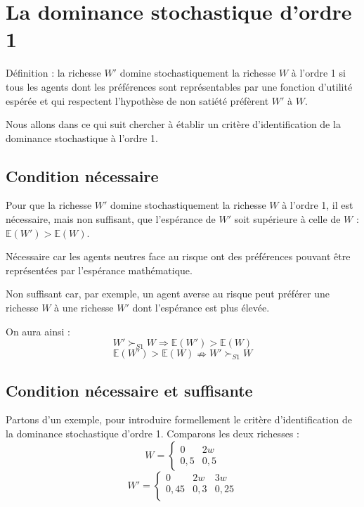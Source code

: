 \documentclass[a4paper, 12pt]{report}
\begin{document}
\section{La dominance stochastique d'ordre 1}


Définition : la richesse \( W' \) domine stochastiquement la richesse \( W \) à l'ordre 1 si tous les agents dont les préférences sont représentables par une fonction d'utilité espérée et qui respectent l'hypothèse de non satiété préfèrent \( W' \) à \( W \).

Nous allons dans ce qui suit chercher à établir un critère d'identification de la dominance stochastique à l'ordre 1.

\subsection{Condition nécessaire}

Pour que la richesse \( W' \) domine stochastiquement la richesse \( W \) à l'ordre 1, il est nécessaire, mais non suffisant, que l'espérance de \( W' \) soit supérieure à celle de \( W \) : \( \mathbb{E}(W') > \mathbb{E}(W) \).

Nécessaire car les agents neutres face au risque ont des préférences pouvant être représentées par l'espérance mathématique.

Non suffisant car, par exemple, un agent averse au risque peut préférer une richesse \( W \) à une richesse \( W' \) dont l'espérance est plus élevée.

On aura ainsi :
\[
W' \succ_{S1} W \Rightarrow \mathbb{E}(W') > \mathbb{E}(W)
\]
\[
\mathbb{E}(W') > \mathbb{E}(W) \nRightarrow W' \succ_{S1} W
\]

\subsection{Condition nécessaire et suffisante}

Partons d'un exemple, pour introduire formellement le critère d'identification de la dominance stochastique d'ordre 1. Comparons les deux richesses :
\[
W = 
\begin{cases} 
0 & 2w \\ 
0,5 & 0,5 
\end{cases} 
\]
\[
W' = 
\left\{\begin{matrix}
	0 & 2w & 3w \\
	0,45 & 0,3  & 0,25  \\
\end{matrix}\right.
\]
\end{document}

